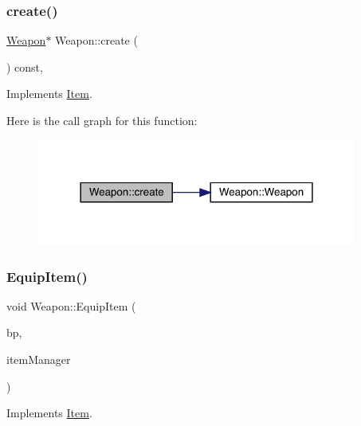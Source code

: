 \subsubsection{\texorpdfstring{create()}{create()}}
{\footnotesize\ttfamily \mbox{\hyperlink{class_weapon}{Weapon}}$\ast$ Weapon\+::create (\begin{DoxyParamCaption}{ }\end{DoxyParamCaption}) const\hspace{0.3cm}{\ttfamily [inline]}, {\ttfamily [virtual]}}



Implements \mbox{\hyperlink{class_item_a17b3fa0cef44ada961e0d3c65e1de864}{Item}}.

Here is the call graph for this function\+:
\nopagebreak
\begin{figure}[H]
\begin{center}
\leavevmode
\includegraphics[width=298pt]{db/de5/class_weapon_a0755dc1352391eb484644ab4e4cf144d_cgraph}
\end{center}
\end{figure}
\mbox{\label{class_weapon_ab40ee049b9f2a5c3cfdec36750f0842d}} 
\subsubsection{\texorpdfstring{Equip\+Item()}{EquipItem()}}
{\footnotesize\ttfamily void Weapon\+::\+Equip\+Item (\begin{DoxyParamCaption}\item[{\mbox{\hyperlink{class_body_part}{Body\+Part}} \&}]{bp,  }\item[{\mbox{\hyperlink{class_item_manager}{Item\+Manager}} \&}]{item\+Manager }\end{DoxyParamCaption})\hspace{0.3cm}{\ttfamily [virtual]}}



Implements \mbox{\hyperlink{class_item_ad1a25684e25e0fc14cbe88f77ea035c2}{Item}}.

